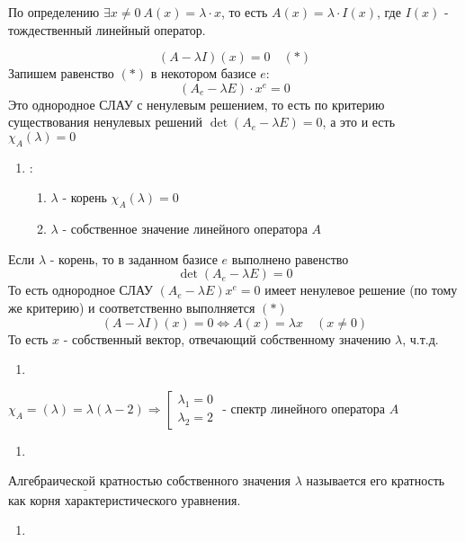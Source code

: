 \documentclass[12pt, letterpaper, twoside]{article}
\newcommand{\Underl}[1]{$\underline{\text{#1}}$}
\begin{document}
        По определению $\exists x\neq 0\ A(x) = \lambda\cdot x$, то есть $A(x) = \lambda \cdot I(x)$, где $I(x)$ - тождественный линейный оператор.\par
        \begin{equation*}
            (A - \lambda I)(x) = 0\quad (*)
        \end{equation*}
        Запишем равенство $(*)$ в некотором базисе $e$:
        \[(A_e - \lambda E)\cdot x^e = 0\]
        Это однородное СЛАУ с ненулевым решением, то есть по критерию существования ненулевых решений $\det(A_e - \lambda E) = 0$, а это и есть\\
        $\chi_A(\lambda) = 0$\newpage
        \begin{enumerate}
            \item[Достаточность]:
            \begin{enumerate}
                \item[Дано:] $\lambda$ - корень $\chi_A(\lambda) = 0$ 
                \item[Доказать:] $\lambda$ - собственное значение линейного оператора $A$
            \end{enumerate}
        \end{enumerate}
        Если $\lambda$ - корень, то в заданном базисе $e$ выполнено равенство
        \[\det(A_e - \lambda E) = 0\]
        То есть однородное СЛАУ $(A_e - \lambda E)x^e = 0$ имеет ненулевое решение (по тому же критерию) и соответственно выполняется $(*)$
        \[(A - \lambda I)(x) = 0 \Leftrightarrow A(x) = \lambda x\quad (x\neq 0)\]
        То есть $x$ - собственный вектор, отвечающий собственному значению $\lambda$, ч.т.д.
        \begin{enumerate}
            \item[\textbf{Пример:}]
        \end{enumerate}
         $\chi_A = (\lambda) = \lambda(\lambda - 2)\Rightarrow \left[ \begin{gathered}
            \lambda_1 = 0\\
            \lambda_2 = 2
         \end{gathered} \right.$ - спектр линейного оператора $A$
         \begin{enumerate}
            \item[\textbf{Определение:}]
         \end{enumerate}
         \Underl{Алгебраической кратностью} собственного значения $\lambda$ называется его кратность как корня характеристического уравнения.
         \begin{enumerate}
            \item[\textbf{Обозначение:}]
         \end{enumerate}
\end{document}
